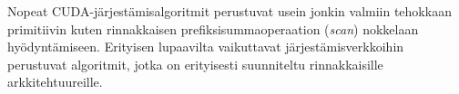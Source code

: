 \documentclass[a4paper,11pt]{article}
\newcommand{\engl}[1]{\foreignlanguage{english}{\em #1}}
\begin{document}
Nopeat CUDA-järjestämisalgoritmit perustuvat usein jonkin valmiin tehokkaan primitiivin kuten rinnakkaisen prefiksisummaoperaation (\engl{scan}) nokkelaan hyödyntämiseen. Erityisen lupaavilta vaikuttavat järjestämisverkkoihin perustuvat algoritmit, jotka on erityisesti suunniteltu rinnakkaisille arkkitehtuureille.

\printbibliography
\end{document}
